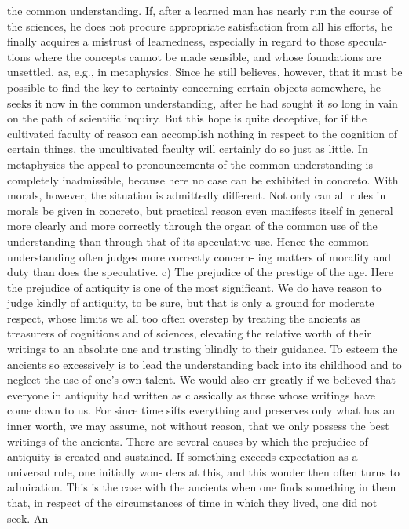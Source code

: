 the common understanding.
If, after a learned man has nearly run the course of the sciences, he
does not procure appropriate satisfaction from all his efforts, he finally
acquires a mistrust of learnedness, especially in regard to those specula-
tions where the concepts cannot be made sensible, and whose foundations
are unsettled, as, e.g., in metaphysics. Since he still believes, however, that
it must be possible to find the key to certainty concerning certain objects
somewhere, he seeks it now in the common understanding, after he had
sought it so long in vain on the path of scientific inquiry.
But this hope is quite deceptive, for if the cultivated faculty of reason
can accomplish nothing in respect to the cognition of certain things, the
uncultivated faculty will certainly do so just as little. In metaphysics the
appeal to pronouncements of the common understanding is completely
inadmissible, because here no case can be exhibited in concreto. With
morals, however, the situation is admittedly different. Not only can all
rules in morals be given in concreto, but practical reason even manifests
itself in general more clearly and more correctly through the organ of the
common use of the understanding than through that of its speculative use.
Hence the common understanding often judges more correctly concern-
ing matters of morality and duty than does the speculative.
c) The prejudice of the prestige of the age. Here the prejudice of antiquity is
one of the most significant. We do have reason to judge kindly of antiquity,
to be sure, but that is only a ground for moderate respect, whose limits we
all too often overstep by treating the ancients as treasurers of cognitions
and of sciences, elevating the relative worth of their writings to an absolute
one and trusting blindly to their guidance. To esteem the ancients so
excessively is to lead the understanding back into its childhood and to
neglect the use of one's own talent. We would also err greatly if we
believed that everyone in antiquity had written as classically as those
whose writings have come down to us. For since time sifts everything and
preserves only what has an inner worth, we may assume, not without
reason, that we only possess the best writings of the ancients.
There are several causes by which the prejudice of antiquity is created
and sustained.
If something exceeds expectation as a universal rule, one initially won-
ders at this, and this wonder then often turns to admiration. This is the
case with the ancients when one finds something in them that, in respect
of the circumstances of time in which they lived, one did not seek. An-
